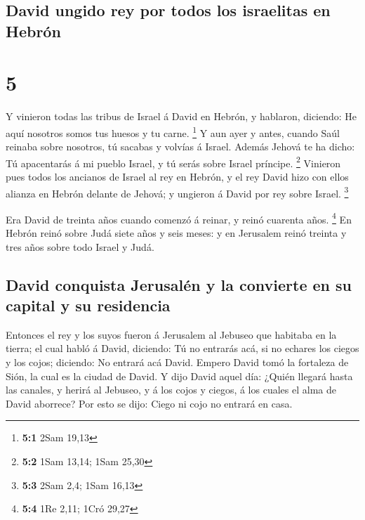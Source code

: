 \hypertarget{david-ungido-rey-por-todos-los-israelitas-en-hebruxf3n}{%
\subsection{David ungido rey por todos los israelitas en
Hebrón}\label{david-ungido-rey-por-todos-los-israelitas-en-hebruxf3n}}

\hypertarget{section-4}{%
\section{5}\label{section-4}}

 Y vinieron todas las tribus de Israel á David en Hebrón,
y hablaron, diciendo: He aquí nosotros somos tus huesos y tu carne.
\footnote{\textbf{5:1} 2Sam 19,13}  Y aun ayer y antes,
cuando Saúl reinaba sobre nosotros, tú sacabas y volvías á Israel.
Además Jehová te ha dicho: Tú apacentarás á mi pueblo Israel, y tú serás
sobre Israel príncipe. \footnote{\textbf{5:2} 1Sam 13,14; 1Sam 25,30}
 Vinieron pues todos los ancianos de Israel al rey en
Hebrón, y el rey David hizo con ellos alianza en Hebrón delante de
Jehová; y ungieron á David por rey sobre Israel. \footnote{\textbf{5:3}
  2Sam 2,4; 1Sam 16,13}

 Era David de treinta años cuando comenzó á reinar, y
reinó cuarenta años. \footnote{\textbf{5:4} 1Re 2,11; 1Cró 29,27}
 En Hebrón reinó sobre Judá siete años y seis meses: y en
Jerusalem reinó treinta y tres años sobre todo Israel y Judá.

\hypertarget{david-conquista-jerusaluxe9n-y-la-convierte-en-su-capital-y-su-residencia}{%
\subsection{David conquista Jerusalén y la convierte en su capital y su
residencia}\label{david-conquista-jerusaluxe9n-y-la-convierte-en-su-capital-y-su-residencia}}

 Entonces el rey y los suyos fueron á Jerusalem al Jebuseo
que habitaba en la tierra; el cual habló á David, diciendo: Tú no
entrarás acá, si no echares los ciegos y los cojos; diciendo: No entrará
acá David.  Empero David tomó la fortaleza de Sión, la
cual es la ciudad de David.  Y dijo David aquel día:
¿Quién llegará hasta las canales, y herirá al Jebuseo, y á los cojos y
ciegos, á los cuales el alma de David aborrece? Por esto se dijo: Ciego
ni cojo no entrará en casa.

